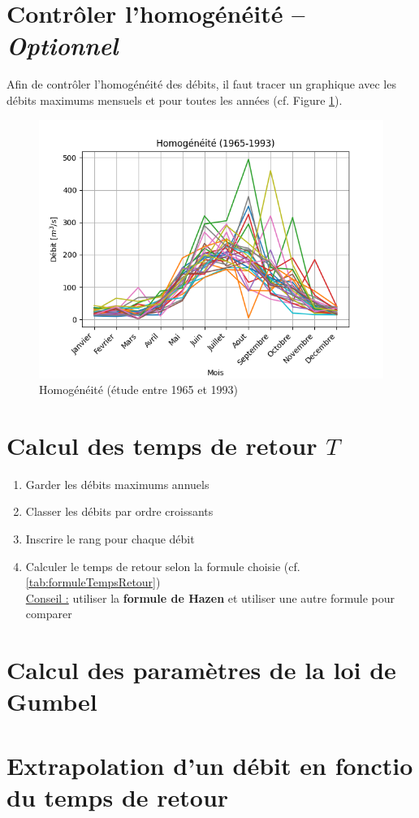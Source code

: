\section{Contrôler l'homogénéité -- \textit{Optionnel}}
Afin de contrôler l'homogénéité des débits, il faut tracer un graphique avec les débits maximums mensuels et pour toutes les années (cf. Figure \ref{graph:homogeneite}).
\begin{figure}[H]
    \centering
    \includegraphics[width=12cm]{homogeneite.png}
    \caption{Homogénéité (étude entre 1965 et 1993)}
    \label{graph:homogeneite}
\end{figure}


\section{Calcul des temps de retour $T$}
\begin{enumerate}
    \item Garder les débits maximums annuels
    \item Classer les débits par ordre croissants
    \item Inscrire le rang pour chaque débit
    \item Calculer le temps de retour selon la formule choisie (cf. \ref{tab:formuleTempsRetour}) \\
    \underline{Conseil :} utiliser la \textbf{{\color{red} formule de Hazen}} et utiliser une autre formule pour comparer
\end{enumerate}



\section{Calcul des paramètres de la loi de Gumbel}
\section{Extrapolation d'un débit en fonctio du temps de retour}

